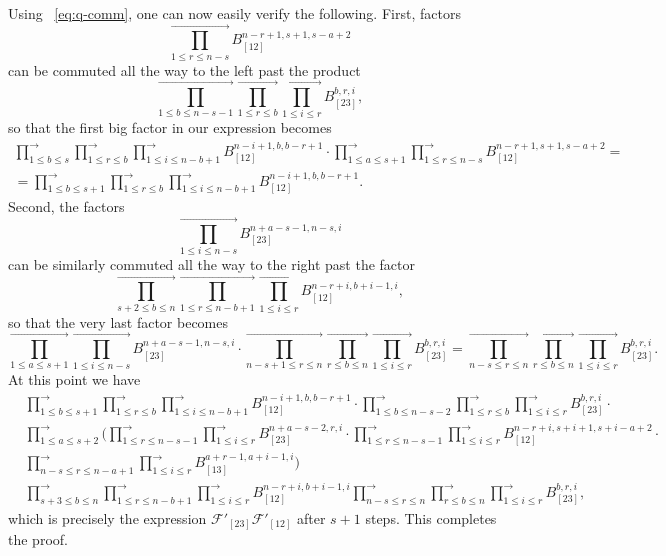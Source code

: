 \documentclass[11pt, reqno]{amsart}
\theoremstyle{definition}
\numberwithin{equation}{section}
\def\longra{\longrightarrow}
\def\le{\leqslant}
\def\Fc{\mathcal F'}
\begin{document}
Using ~\eqref{eq:q-comm}, one can now easily verify the following. First, factors
$$
\prod_{1 \le r \le n-s}^{\longra} B_{[12]}^{n-r+1,s+1,s-a+2}
$$
can be commuted all the way to the left past the product
$$
\prod_{1 \le b \le n-s-1}^{\longra} \prod_{1 \le r \le b}^{\longra} \prod_{1 \le i \le r}^{\longra} B_{[23]}^{b,r,i},
$$
so that the first big factor in our expression becomes
\begin{multline*}
\prod_{1 \le b \le s}^{\longra} \prod_{1 \le r \le b}^{\longra} \prod_{1 \le i \le n-b+1}^{\longra} B_{[12]}^{n-i+1,b,b-r+1} \cdot \prod_{1\le a \le s+1}^{\longra} \prod_{1 \le r \le n-s}^{\longra} B_{[12]}^{n-r+1,s+1,s-a+2} = \\
= \prod_{1 \le b \le s+1}^{\longra} \prod_{1 \le r \le b}^{\longra} \prod_{1 \le i \le n-b+1}^{\longra} B_{[12]}^{n-i+1,b,b-r+1}.
\end{multline*}
Second, the factors
$$
\prod_{1 \le i \le n-s}^{\longra} B_{[23]}^{n+a-s-1,n-s,i}
$$
can be similarly commuted all the way to the right past the factor
$$
\prod_{s+2 \le b \le n}^{\longra} \prod_{1 \le r \le n-b+1}^{\longra} \prod_{1 \le i \le r}^{\longra} B_{[12]}^{n-r+i,b+i-1,i},
$$
so that the very last factor becomes
$$
\prod_{1\le a \le s+1}^{\longra} \prod_{1 \le i \le n-s}^{\longra} B_{[23]}^{n+a-s-1,n-s,i} \cdot  \prod_{n-s+1 \le r \le n}^{\longra} \prod_{r \le b \le n}^{\longra} \prod_{1 \le i \le r}^{\longra} B_{[23]}^{b,r,i} = \prod_{n-s \le r \le n}^{\longra} \prod_{r \le b \le n}^{\longra} \prod_{1 \le i \le r}^{\longra} B_{[23]}^{b,r,i}.
$$
At this point we have
\begin{align*}
&\prod_{1 \le b \le s+1}^{\longra} \prod_{1 \le r \le b}^{\longra} \prod_{1 \le i \le n-b+1}^{\longra} B_{[12]}^{n-i+1,b,b-r+1} \cdot \prod_{1 \le b \le n-s-2}^{\longra} \prod_{1 \le r \le b}^{\longra} \prod_{1 \le i \le r}^{\longra} B_{[23]}^{b,r,i} \cdot \\
&\prod_{1 \le a \le s+2}^{\longra} \Bigg( \prod_{1 \le r \le n-s-1}^{\longra} \prod_{1 \le i \le r}^{\longra} B_{[23]}^{n+a-s-2,r,i} \cdot \prod_{1 \le r \le n-s-1}^{\longra} \prod_{1 \le i \le r}^{\longra} B_{[12]}^{n-r+i,s+i+1,s+i-a+2} \cdot \\
&\prod_{n-s \le r \le n-a+1}^{\longra} \prod_{1 \le i \le r}^{\longra} B_{[13]}^{a+r-1,a+i-1,i} \Bigg) \\
&\prod_{s+3 \le b \le n}^{\longra} \prod_{1 \le r \le n-b+1}^{\longra} \prod_{1 \le i \le r}^{\longra} B_{[12]}^{n-r+i,b+i-1,i} \prod_{n-s \le r \le n}^{\longra} \prod_{r \le b \le n}^{\longra} \prod_{1 \le i \le r}^{\longra} B_{[23]}^{b,r,i},
\end{align*}
which is precisely the expression $\Fc_{[23]}\Fc_{[12]}$ after $s+1$ steps. This completes the proof.
\end{document}
